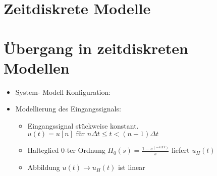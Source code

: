 \documentclass[ngerman]{tudscrreprt}
\begin{document}
\section{Zeitdiskrete Modelle}
\section{Übergang in zeitdiskreten Modellen}
\begin{itemize}
\item System- Modell Konfiguration:
\item Modellierung des Eingangssignals:
\begin{itemize}
\item Eingangssignal stückweise konstant. $ u(t) = u[n] \text{ für } n\Delta t \le t < (n+1)\Delta t$
\item Halteglied $0$-ter Ordnung $H_0(s) = \frac{1-e^{(-s\Delta T)} }{s}$ liefert $u_H(t)$
\item Abbildung $u(t) \rightarrow u_H(t)$ ist linear 
\end{itemize}
\end{itemize}
\end{document}
